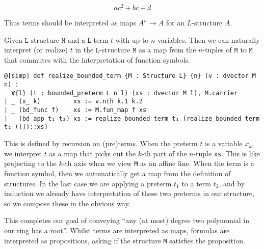 \[ a c^{2} + b c + d \]

Thus terms should be interpreted as maps $A^{n} \to A$ for an $L$-structure $A$.

\begin{dfn}
    Given $\texttt{L}$-structure $\texttt{M}$ and a $\texttt{L}$-term $t$ with up to $n$-variables.
    Then we can naturally interpret (or realize) $t$ in the $\texttt{L}$-structure $\texttt{M}$ as a
    map from the $n$-tuples of $\texttt{M}$ to $\texttt{M}$ that
    commutes with the interpretation of function symbols.

    \begin{lstlisting}
@[simp] def realize_bounded_term {M : Structure L} {n} (v : dvector M n) :
  ∀{l} (t : bounded_preterm L n l) (xs : dvector M l), M.carrier
| _ (x_ k)         xs := v.nth k.1 k.2
| _ (bd_func f)    xs := M.fun_map f xs
| _ (bd_app t₁ t₂) xs := realize_bounded_term t₁ (realize_bounded_term t₂ ([])::xs) \end{lstlisting}

    This is defined by recursion on (pre)terms.
    When the preterm $t$ is a variable $x_{k}$, we interpret $t$ as a map
    that picks out the $k$-th part of the $n$-tuple \texttt{xs}.
    This is like projecting to the $k$-th axis when we view \texttt{M} as an affine line.
    When the term is a function symbol, then we automatically get a map from the
    definition of structures.
    In the last case we are applying a preterm $t_{1}$ to a term $t_{2}$,
    and by induction we already have interpretation of these two preterms
    in our structure, so we compose these in the obvious way.
\end{dfn}

This completes our goal of conveying
``any (at most) degree two polynomial in our ring has a root''.
Whilst terms are interpreted as maps, formulas are interpreted as propositions,
asking if the structure \texttt{M} satisfies the proposition.

